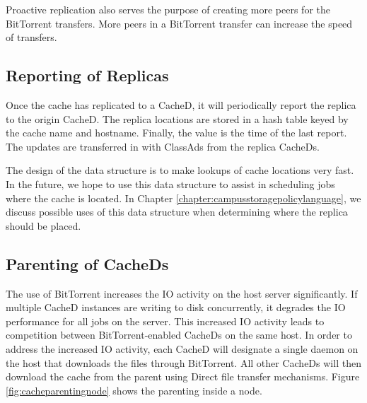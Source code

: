 Proactive replication also serves the purpose of creating more peers for the BitTorrent transfers.  More peers in a BitTorrent transfer can increase the speed of transfers.



\subsection{Reporting of Replicas}

Once the cache has replicated to a CacheD, it will periodically report the replica to the origin CacheD.  The replica locations are stored in a hash table keyed by the cache name and hostname.  Finally, the value is the time of the last report.  The updates are transferred in with ClassAds from the replica CacheDs.

The design of the data structure is to make lookups of cache locations very fast.  In the future, we hope to use this data structure to assist in scheduling jobs where the cache is located.  In Chapter \ref{chapter:campusstoragepolicylanguage}, we discuss possible uses of this data structure when determining where the replica should be placed.  



\subsection{Parenting of CacheDs} \label{sec:cachedparenting}
The use of BitTorrent increases the IO activity on the host server significantly.  If multiple CacheD instances are writing to disk concurrently, it degrades the IO performance for all jobs on the server.  This increased IO activity leads to competition between BitTorrent-enabled CacheDs on the same host.  In order to address the increased IO activity, each CacheD will designate a single daemon on the host that downloads the files through BitTorrent.  All other CacheDs will then download the cache from the parent using Direct file transfer mechanisms.  Figure \ref{fig:cacheparentingnode} shows the parenting inside a node. 

